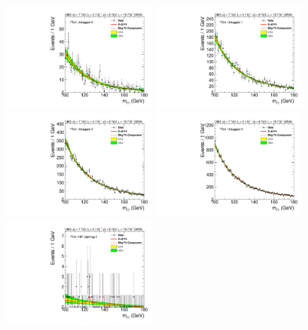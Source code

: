 \begin{figure}
  \vspace{-1cm}
  \includegraphics[width=0.49\textwidth]{results/plots/mgg-cats/mgg_mva_nosub_ch1_cat0_7TeV.pdf}
  \includegraphics[width=0.49\textwidth]{results/plots/mgg-cats/mgg_mva_nosub_ch1_cat1_7TeV.pdf}
  \includegraphics[width=0.49\textwidth]{results/plots/mgg-cats/mgg_mva_nosub_ch1_cat2_7TeV.pdf}
  \includegraphics[width=0.49\textwidth]{results/plots/mgg-cats/mgg_mva_nosub_ch1_cat3_7TeV.pdf}
  \includegraphics[width=0.49\textwidth]{results/plots/mgg-cats/mgg_mva_nosub_ch1_cat4_7TeV.pdf}

\end{figure}
